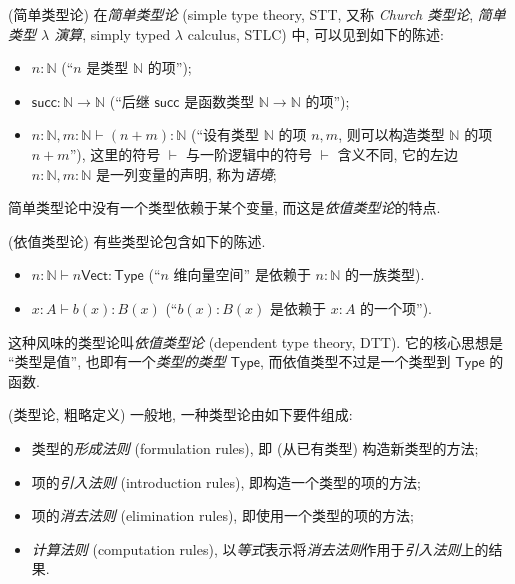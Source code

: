 \begin{example}
	{(简单类型论)}
	在\emph{简单类型论} (simple type theory, STT, 又称 \emph{Church 类型论}, \emph{简单类型 $\lambda$ 演算}, simply typed $\lambda$ calculus, STLC\footnotemark{}) 中, 可以见到如下的陈述:
	\begin{itemize}
		\item $n\colon \mathbb{N}$ (``$n$ 是类型 $\mathbb{N}$ 的项'');
		\item $\mathsf {succ}\colon \mathbb{N}\to\mathbb{N}$ (``后继 $\mathsf {succ}$ 是函数类型 $\mathbb{N}\to\mathbb{N}$ 的项'');
		\item $n\colon \mathbb{N},m\colon \mathbb{N} \vdash (n+m) \colon \mathbb{N}$ (``设有类型 $\mathbb{N}$ 的项 $n,m$, 则可以构造类型 $\mathbb{N}$ 的项 $n+m$''), 这里的符号 $\vdash$ 与一阶逻辑中的符号 $\vdash$ 含义不同, 它的左边 $n\colon \mathbb{N},m\colon \mathbb{N}$ 是一列变量的声明, 称为\emph{语境};
	\end{itemize}
\end{example}

简单类型论中没有一个类型依赖于某个变量, 而这是\emph{依值类型论}的特点.

\begin{example}
	{(依值类型论)}
	有些类型论包含如下的陈述.
	\begin{itemize}
		\item $n\colon \mathbb{N}\vdash n\mathsf {Vect}\colon \mathsf {Type}$ (``$n$ 维向量空间'' 是依赖于 $n:\mathbb{N}$ 的一族类型).
		\item $x:A\vdash b(x):B(x)$ (``$b(x):B(x)$ 是依赖于 $x:A$ 的一个项'').
	\end{itemize}
	这种风味的类型论叫\emph{依值类型论} (dependent type theory, DTT). 它的核心思想是 ``类型是值'', 也即有一个\emph{类型的类型} $\mathsf {Type}$, 而依值类型不过是一个类型到 $\mathsf {Type}$ 的函数. %
\end{example}

\begin{definition}
	{(类型论, 粗略定义)}
	一般地, 一种类型论由如下要件组成:
	\begin{itemize}
		\item 类型的\emph{形成法则} (formulation rules), 即 (从已有类型) 构造新类型的方法;
		\item 项的\emph{引入法则} (introduction rules), 即构造一个类型的项的方法;
		\item 项的\emph{消去法则} (elimination rules), 即使用一个类型的项的方法;
		\item \emph{计算法则} (computation rules), 以\emph{等式}表示将\emph{消去法则}作用于\emph{引入法则}上的结果.
	\end{itemize}
\end{definition}

